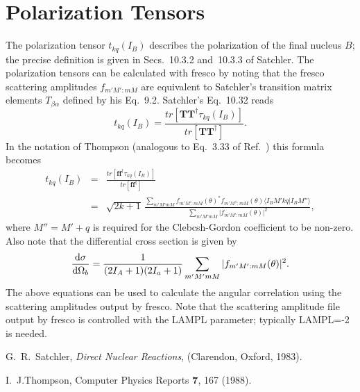 \documentclass[aps,prc,amsfonts,nofootinbib]{revtex4}
\begin{document}
\section{Polarization Tensors}

The polarization tensor $t_{kq}(I_B)$ describes the polarization
of the final nucleus $B$; the precise definition is given in
Secs.~10.3.2 and~10.3.3 of Satchler.
The polarization tensors can be calculated with {\sc fresco}
by noting that the {\sc fresco} scattering amplitudes
$f_{m'M':mM}$ are equivalent to Satchler's transition
matrix elements $T_{\beta\alpha}$ defined by his Eq.~9.2.
Satchler's Eq.~10.32 reads
\begin{equation}
t_{kq}(I_B)=\frac{tr[{\bm T}{\bm T}^\dag \tau_{kq}(I_B)]}
{tr[{\bm T}{\bm T}^\dag]}.
\end{equation}
In the notation of Thompson (analogous to Eq.~3.33 of Ref.~\cite{Tho88})
this formula becomes
\begin{eqnarray}
t_{kq}(I_B) &=&\frac{tr[{\bm f}{\bm f}^\dag \tau_{kq}(I_B)]}
  {tr[{\bm f}{\bm f}^\dag]} \nonumber \\
&=& \sqrt{2k+1} \, \frac{ \displaystyle \sum_{m'M'mM} f_{m'M':mM}(\theta)^*
  f_{m'M'':mM}(\theta) \langle I_BM'kq|I_BM''\rangle }
  { \displaystyle \sum_{m'M'mM} |f_{m'M':mM}(\theta)|^2 },
\end{eqnarray}
where $M''=M'+q$ is required for the Clebcsh-Gordon coefficient to be non-zero.
Also note that the differential cross section is given by
\begin{equation}
\frac{{\rm d}\sigma}{{\rm d}\Omega_b}=\frac{1}{(2I_A+1)(2I_a+1)}
\displaystyle \sum_{m'M'mM} |f_{m'M':mM}(\theta)|^2.
\end{equation}
The above equations can be used to calculate the angular correlation
using the scattering amplitudes output by {\sc fresco}.
Note that the scattering amplitude
file output by {\sc fresco}  is controlled with the LAMPL parameter;
typically LAMPL=-2 is needed. 

\begin{thebibliography}{9}

 G.~R.~Satchler, {\it Direct Nuclear Reactions},
  (Clarendon, Oxford, 1983).

 I.~J.Thompson, Computer Physics Reports {\bf 7}, 167 (1988).

\end{thebibliography}
\end{document}
